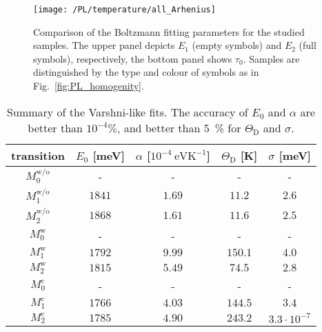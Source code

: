 \begin{figure}
	\centering
	\texttt{[image: /PL/temperature/all\_Arhenius]}
	\caption{Comparison of the Boltzmann fitting parameters for the studied samples. The upper panel depicts $E_1$ (empty symbols) and $E_2$ (full symbols), respectively, the bottom panel shows $\tau_0$. Samples are distinguished by the type and colour of symbols as in Fig.~\ref{fig:PL_homogenity}.}
	\label{fig:Arrhenius_all}
\end{figure}


\begin{table}
	\centering
	\caption{Summary of the Varshni-like fits. The accuracy of $E_0$ and $\alpha$ are better than $10^{-4}\%$, and better than 5~\% for $\Theta_\mathrm{D}$ and $\sigma$.}
	\begin{tabularx}{0.9\textwidth}{cCCcc}
		\toprule
		
		transition & $E_0$ [meV]& $\alpha$ [$10^{-4}~\mathrm{eVK^{-1}}$]& $\Theta_\mathrm{D}$ [K]& $\sigma$ [meV]\\ 	
		\midrule
		\midrule
		$M_0^\mathrm{w/o}$& - & -& -&-\\
		$M_1^\mathrm{w/o}$& $1841$ & $1.69$& $11.2$&$2.6$\\
		$M_2^\mathrm{w/o}$ & $1868$ & $1.61$& $11.6$& $2.5$\\ 
		
		\midrule
		$M_0^\mathrm{w}$& - & -& -&-\\
		$M_1^\mathrm{w}$& $1792$ & $9.99$& $150.1$&$4.0$\\
		$M_2^\mathrm{w}$ & $1815$& $5.49$& $74.5$& $2.8$\\ 
		
		\midrule
		$M_0^\mathrm{c}$& - & -& -&-\\
		$M_1^\mathrm{c}$& $1766$ & $4.03$& $144.5$& $3.4$\\
		$M_2^\mathrm{c}$ & $1785$ & $4.90$& $243.2$& $3.3\cdot 10^{-7}$\\
		
		\bottomrule
	\end{tabularx}\label{tab:Varshni}
\end{table}

